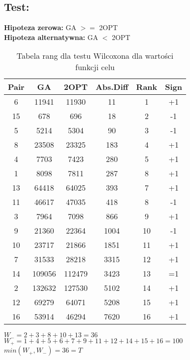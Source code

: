     \subsection{Test: }
    \textbf{Hipoteza zerowa: } GA $>=$ 2OPT \\
    \textbf{Hipoteza alternatywna: } GA $<$ 2OPT \\
    \begin{table}[H]
      \centering
      \begin{tabular}{| c | c | c | c | c | c |}
        \hline
        Pair & GA & 2OPT & Abs.Diff & Rank & Sign \\
        \hline
        6 & 11941 & 11930 & 11 & 1 & +1 \\
        15 & 678 & 696 & 18 & 2 & -1 \\
        5 & 5214 & 5304 & 90 & 3 & -1 \\
        8 & 23508 & 23325 & 183 & 4 & +1 \\
        4 & 7703 & 7423 & 280 & 5 & +1 \\
        1 & 8098 & 7811 & 287 & 8 & +1 \\
        13 & 64418 & 64025 & 393 & 7 & +1 \\
        11 & 46617 & 47035 & 418 & 8 & -1 \\
        3 & 7964 & 7098 & 866 & 9 & +1 \\
        9 & 21360 & 22364 & 1004 & 10 & -1 \\
        10 & 23717 & 21866 & 1851 & 11 & +1 \\
        7 & 31533 & 28218 & 3315 & 12 & +1 \\
        14 & 109056 & 112479 & 3423 & 13 & =1 \\
        2 & 132632 & 127530 & 5102 & 14 & +1 \\
        12 & 69279 & 64071 & 5208 & 15 & +1 \\
        16 & 53914 & 46294 & 7620 & 16 & +1 \\

        \hline
          
      \end{tabular}
      \caption{Tabela rang dla testu Wilcoxona dla wartości funkcji celu}
      $W_{-} = 2+3+8+10+13=36 $
      $W_{+} = 1+4+5+6+7+9+11+12+14+15+16 = 100 $
      $min(W_{+},W_{-}) = 36 = T$
  
    \end{table}


